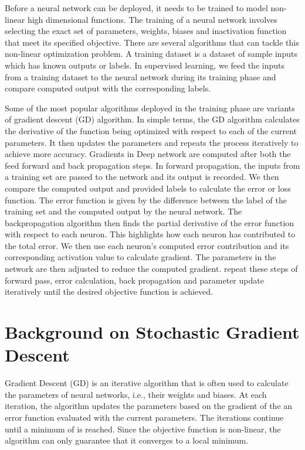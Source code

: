\documentclass[conference]{IEEEtran}
\begin{document}

Before a neural network can be deployed, it needs to be trained to model non-linear high dimensional functions. The training of a neural network involves selecting the exact set of parameters, weights, biases and inactivation function that meet its specified objective. There are several algorithms that can tackle this non-linear optimization problem. A training dataset is a dataset of sample inputs which has  known outputs or labels. In supervised learning,  we feed the inputs from a training dataset to the neural network during its training phase and compare computed output with the corresponding labels.

Some of the most popular algorithms deployed in the training phase are variants of gradient descent (GD)  algorithm. In simple terms, the GD algorithm calculates the derivative of the function being optimized with respect to each of the current parameters. It then updates the parameters and repeats the process iteratively to achieve more accuracy. 
Gradients in Deep network are computed after both the feed forward and back propagation steps. In forward propagation, the inputs from a training set are passed to the network and its output is recorded. We then compare the computed output and provided labels to calculate the error or loss function. The error function is given by the difference between the label of the training set and the computed output by the neural network. The backpropagation algorithm then finds the partial derivative of the error function with respect to each neuron. This highlights how each neuron has contributed to the total error. We then use each neuron's computed error contribution and its corresponding activation value to calculate gradient. The parameters in the network are then adjusted to reduce the computed gradient.
 repeat these steps of forward pass, error calculation, back propagation and parameter update iteratively until the desired objective function is achieved.



\section{Background on Stochastic Gradient Descent}
Gradient Descent (GD) is an iterative algorithm that is often used to calculate the parameters of neural
networks, i.e., their weights and biases. At each iteration, the  algorithm updates the parameters based on the gradient of the 
an error function evaluated with the current parameters. The iterations continue until a minimum of  is reached. Since the objective
function is non-linear, the algorithm can only guarantee that it converges to a local minimum.
\end{document}
